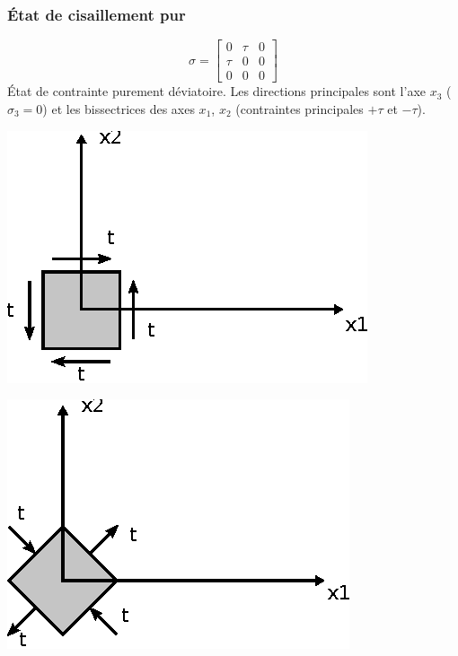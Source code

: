 \subsubsection{État de cisaillement pur}
\begin{equation}
    \mathbb{\sigma} = 
    \begin{bmatrix}
        0 & \tau & 0 \\
        \tau & 0 & 0 \\
        0 & 0 & 0
    \end{bmatrix}
    \label{eq:Ch02-021}
\end{equation}
État de contrainte purement déviatoire.
Les directions principales sont l'axe $x_3$ ($\sigma_3= 0$) et les bissectrices des axes $x_1$, $x_2$ (contraintes principales $+\tau$ et $-\tau$). 
\begin{multicols}{2}
    \begin{center}
        \includegraphics{../images/T1_Ch02-0009a}
    \end{center}
    \begin{center}
        \includegraphics{../images/T1_Ch02-0009b}
    \end{center}
\end{multicols}
